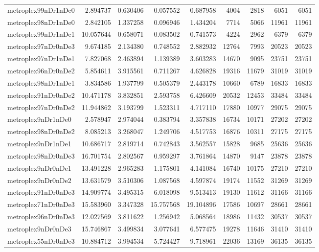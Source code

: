 \begin{longtable}{|l|r|r|r|r|r|r|r|r|}
metroplex99nDr1nDe0 & 2.894737 & 0.630406 & 0.057552 & 0.687958 & 4004 & 2818 & 6051 & 6051 \\
metroplex98nDr1nDe0 & 2.842105 & 1.337258 & 0.096946 & 1.434204 & 7714 & 5066 & 11961 & 11961 \\
metroplex99nDr1nDe1 & 10.057644 & 0.658071 & 0.083502 & 0.741573 & 4224 & 2962 & 6379 & 6379 \\
metroplex97nDr0nDe3 & 9.674185 & 2.134380 & 0.748552 & 2.882932 & 12764 & 7993 & 20523 & 20523 \\
metroplex97nDr1nDe1 & 7.827068 & 2.463894 & 1.139389 & 3.603283 & 14670 & 9095 & 23751 & 23751 \\
metroplex96nDr0nDe2 & 5.854611 & 3.915561 & 0.711267 & 4.626828 & 19316 & 11679 & 31019 & 31019 \\
metroplex98nDr1nDe1 & 3.834586 & 1.937799 & 0.505379 & 2.443178 & 10660 & 6789 & 16833 & 16833 \\
metroplex91nDr0nDe2 & 10.471178 & 3.832851 & 2.593758 & 6.426609 & 20532 & 12453 & 33484 & 33484 \\
metroplex97nDr0nDe2 & 11.944862 & 3.193799 & 1.523311 & 4.717110 & 17880 & 10977 & 29075 & 29075 \\
metroplex9nDr1nDe0 & 2.578947 & 2.974044 & 0.383794 & 3.357838 & 16734 & 10171 & 27202 & 27202 \\
metroplex98nDr0nDe2 & 8.085213 & 3.268047 & 1.249706 & 4.517753 & 16876 & 10311 & 27175 & 27175 \\
metroplex9nDr1nDe1 & 10.686717 & 2.819714 & 0.742843 & 3.562557 & 15828 & 9685 & 25636 & 25636 \\
metroplex98nDr0nDe3 & 16.701754 & 2.802567 & 0.959297 & 3.761864 & 14870 & 9147 & 23878 & 23878 \\
metroplex9nDr0nDe1 & 13.491228 & 2.965283 & 1.175801 & 4.141084 & 16740 & 10175 & 27210 & 27210 \\
metroplex9nDr0nDe2 & 13.631579 & 3.510306 & 1.087568 & 4.597874 & 19174 & 11552 & 31269 & 31269 \\
metroplex91nDr0nDe3 & 14.909774 & 3.495315 & 6.018098 & 9.513413 & 19130 & 11612 & 31166 & 31166 \\
metroplex71nDr0nDe3 & 15.583960 & 3.347328 & 15.757568 & 19.104896 & 17586 & 10697 & 28661 & 28661 \\
metroplex96nDr0nDe3 & 12.027569 & 3.811622 & 1.256942 & 5.068564 & 18986 & 11432 & 30537 & 30537 \\
metroplex9nDr0nDe3 & 15.746867 & 3.499834 & 3.077641 & 6.577475 & 19278 & 11646 & 31410 & 31410 \\
metroplex55nDr0nDe3 & 10.884712 & 3.994534 & 5.724427 & 9.718961 & 22036 & 13169 & 36135 & 36135 \\
\end{longtable}
